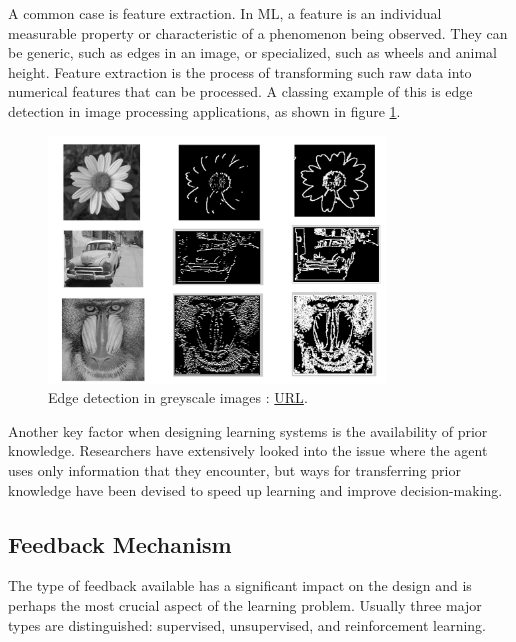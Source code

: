 A common case is feature extraction. In ML, a feature \cite{Elgendy2020_ml_feature} is an individual measurable property or characteristic of a phenomenon being observed. They can be generic, such as edges in an image, or specialized, such as wheels and animal height. Feature extraction is the process of transforming such raw data into numerical features that can be processed. A classing example of this is edge detection in image processing applications, as shown in figure \ref{fig:Edge detection in greyscale images}.
\begin{figure}[H]
    \centering
        \includegraphics[width=0.8\textwidth]{Images/edge_detection.png}
        \decoRule
        \caption[Edge detection in greyscale images]{Edge detection in greyscale images \cite{edge_detection}: \href{https://aryamansharda.medium.com/how-image-edge-detection-works-b759baac01e2}{URL}.}
        \label{fig:Edge detection in greyscale images}
\end{figure}

Another key factor when designing learning systems is the availability of prior knowledge. Researchers have extensively looked into the issue where the agent uses only information that they encounter, but ways for transferring prior knowledge have been devised to speed up learning and improve decision-making.\cite{Transfer_Learning}

\subsection{Feedback Mechanism}
The type of feedback available has a significant impact on the design and is perhaps the most crucial aspect of the learning problem. Usually three major types are distinguished: supervised, unsupervised, and reinforcement learning.

